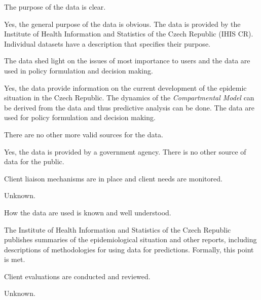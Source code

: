 \begin{QandA}
    \item The purpose of the data is clear.
    \begin{answered}
        Yes, the general purpose of the data is obvious.
        The data is provided by the Institute of Health Information and Statistics of the Czech Republic (IHIS CR).
        Individual datasets have a description that specifies their purpose.
    \end{answered}

    \item The data shed light on the issues of most importance to users and the data are used in policy formulation and decision making.
    \begin{answered}
        Yes, the data provide information on the current development of the epidemic situation in the Czech Republic.
        The dynamics of the \textit{Compartmental Model} can be derived from the data and thus predictive analysis can be done.
        The data are used for policy formulation and decision making.
    \end{answered}

    \item There are no other more valid sources for the data.
    \begin{answered}
        Yes, the data is provided by a government agency.
        There is no other source of data for the public.
    \end{answered}

    \item Client liaison mechanisms are in place and client needs are monitored.
    \begin{answered}
        Unknown.
    \end{answered}

    \item How the data are used is known and well understood.
    \begin{answered}
        The Institute of Health Information and Statistics of the Czech Republic publishes summaries of the epidemiological situation and other reports, including descriptions of methodologies for using data for predictions.
        Formally, this point is met.
    \end{answered}

    \item Client evaluations are conducted and reviewed.
    \begin{answered}
        Unknown.
    \end{answered}


\end{QandA}
